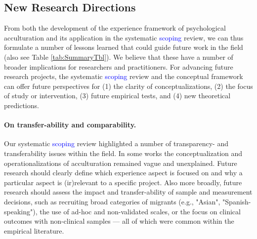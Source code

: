 \documentclass[man, 12pt, a4paper, mask]{apa7}
\begin{document}
\subsection{New Research Directions}
From both the development of the experience framework of psychological acculturation and its application in the systematic \textcolor{blue}{scoping} review, we can thus formulate a number of lessons learned that could guide future work in the field (also see Table \ref{tab:SummaryTbl}). We believe that these have a number of broader implications for researchers and practitioners.
For advancing future research projects, the systematic \textcolor{blue}{scoping} review and the conceptual framework can offer future perspectives for (1) the clarity of conceptualizations, (2) the focus of study or intervention, (3) future empirical tests, and (4) new theoretical predictions. 

\paragraph{On transfer-ability and comparability.} Our systematic \textcolor{blue}{scoping} review highlighted a number of transparency- and transferability issues within the field. In some works the conceptualization and operationalizations of acculturation remained vague and unexplained. Future research should clearly define which experience aspect is focused on and why a particular aspect is (ir)relevant to a specific project. Also more broadly, future research should assess the impact and transfer-ability of sample and measurement decisions, such as recruiting broad categories of migrants (e.g., "Asian", "Spanish-speaking"), the use of ad-hoc and non-validated scales, or the focus on clinical outcomes with non-clinical samples --- all of which were common within the empirical literature.


\end{document}
